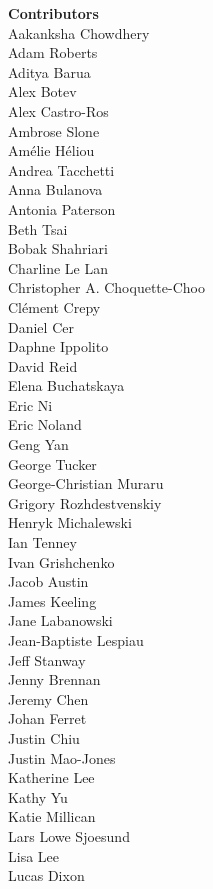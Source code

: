 \noindent\textbf{Contributors} \\
Aakanksha Chowdhery \\
Adam Roberts \\
Aditya Barua \\
Alex Botev \\
Alex Castro-Ros \\
Ambrose Slone \\
Amélie Héliou \\
Andrea Tacchetti \\
Anna Bulanova \\
Antonia Paterson \\
Beth Tsai \\
Bobak Shahriari \\
Charline Le Lan \\
Christopher A. Choquette-Choo \\
Clément Crepy \\
Daniel Cer \\
Daphne Ippolito \\
David Reid \\
Elena Buchatskaya \\
Eric Ni \\
Eric Noland \\
Geng Yan \\
George Tucker  \\
George-Christian Muraru \\
Grigory Rozhdestvenskiy \\
Henryk Michalewski \\
Ian Tenney \\
Ivan Grishchenko \\
Jacob Austin \\
James Keeling \\
Jane Labanowski \\
Jean-Baptiste Lespiau \\
Jeff Stanway \\
Jenny Brennan \\
Jeremy Chen \\
Johan Ferret \\
Justin Chiu \\
Justin Mao-Jones \\
Katherine Lee \\
Kathy Yu \\
Katie Millican \\
Lars Lowe Sjoesund \\
Lisa Lee \\
Lucas Dixon \\
